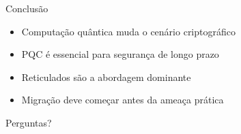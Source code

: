 \documentclass[aspectratio=169]{beamer}
\begin{document}
	\begin{frame}{Conclusão}
		\begin{itemize}
			\item Computação quântica muda o cenário criptográfico
			\item PQC é essencial para segurança de longo prazo
			\item Reticulados são a abordagem dominante
			\item Migração deve começar antes da ameaça prática
		\end{itemize}
	\end{frame}
	
	\begin{frame}
		\centering
		\Huge Perguntas?
	\end{frame}
	
\end{document}
